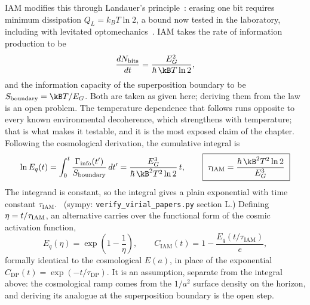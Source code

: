 IAM modifies this through Landauer's principle~\cite{Landauer1961}: erasing one bit requires minimum dissipation $Q_L=k_BT\ln2$, a bound now tested in the
laboratory, including with levitated optomechanics~\cite{Berut2012,Ciampini2025}. IAM takes the rate of information production to be
\begin{equation}
 \frac{dN_{\mathrm{bits}}}{dt}=\frac{E_G^2}{\hbar\,\kB T\ln2},\label{eq:gd_bitrate}
\end{equation}
and the information capacity of the superposition boundary to be $S_{\mathrm{boundary}}=\kB T/E_G$. Both are taken as given here; deriving them from the law is an open problem.
\conjecture{} The temperature dependence that follows runs opposite to every known environmental decoherence, which strengthens with temperature; that is
what makes it testable, and it is the most exposed claim of the chapter. Following the cosmological derivation, the cumulative integral is
\begin{equation}
 \ln E_q(t)=\int_0^t\frac{\Gamma_{\mathrm{info}}(t')}{S_{\mathrm{boundary}}}\,dt'=\frac{E_G^3}{\hbar\,\kB^2T^2\ln2}\,t,\qquad
 \boxed{\;\tau_{\mathrm{IAM}}=\frac{\hbar\,\kB^2T^2\ln2}{E_G^3}\;}
 \label{eq:tauIAM}
\end{equation}
The integrand is constant, so the integral gives a plain exponential with time constant $\tau_{\mathrm{IAM}}$. \derived\ (sympy: \texttt{verify\_virial\_papers.py}
section L.) Defining $\eta=t/\tau_{\rm IAM}$, an alternative carries over the functional form of the cosmic activation function,
\begin{equation}
 E_q(\eta)=\exp\!\left(1-\frac1\eta\right),\qquad C_{\mathrm{IAM}}(t)=1-\frac{E_q(t/\tau_{\mathrm{IAM}})}{e},\label{eq:gd_ramp}
\end{equation}
formally identical to the cosmological $E(a)$, in place of the exponential $C_{\mathrm{DP}}(t)=\exp(-t/\tau_{\mathrm{DP}})$. It is an assumption, separate from the integral above: the cosmological ramp comes from the $1/a^2$ surface density on the horizon, and deriving its analogue at the superposition boundary is the open step. \conjecture\ \openprob

